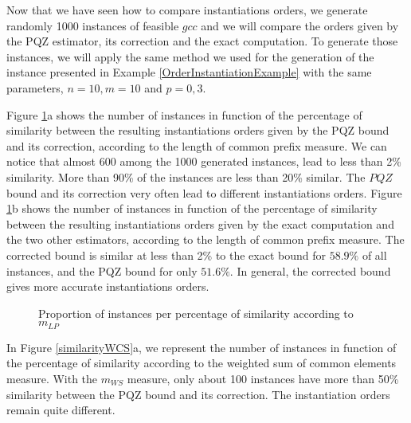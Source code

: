 \documentclass[jair,twoside,11pt,theapa]{article}
\begin{document}
Now that we have seen how to compare instantiations orders, we generate randomly 1000 instances of feasible $gcc$ and we will compare the orders given by the PQZ estimator, its correction and the exact computation. To generate those instances, we will apply the same method we used for the generation of the instance presented in Example \ref{OrderInstantiationExample} with the same parameters, $n=10, m=10$ and $p=0,3$.

Figure \ref{similarityLenghtCommonPrefix}a shows the number of instances in function of the percentage of similarity between the resulting instantiations orders given by the PQZ bound and its correction, according to the length of common prefix measure. We can notice that almost 600 among the 1000 generated instances, lead to less than 2\% similarity. More than 90\% of the instances are less than 20\% similar. The $PQZ$ bound and its correction very often lead to different instantiations orders. 
%
Figure \ref{similarityLenghtCommonPrefix}b shows the number of instances in function of the percentage of similarity between the resulting instantiations orders given by the exact computation and the two other estimators, according to the length of common prefix measure. The corrected bound is similar at less than 2\% to the exact bound for $58.9\%$ of all instances, and the PQZ bound for only $51.6\%$. %
In general, the corrected bound gives more accurate instantiations orders.

\begin{figure}

	\begin{minipage}[c]{.46\linewidth}
     	 
	\end{minipage} \hfill
	\begin{minipage}[c]{.46\linewidth}
     	 
  	 \end{minipage}
    \caption{Proportion of instances per percentage of similarity according to $m_{LP}$}
    \label{similarityLenghtCommonPrefix}
    
\end{figure}


In Figure \ref{similarityWCS}a, we represent the number of instances in function of the percentage of similarity according to the weighted sum of common elements measure. With the $m_{WS}$ measure, only about 100 instances have more than 50\% similarity between the PQZ bound and its correction. The instantiation orders remain quite different. 
\end{document}

